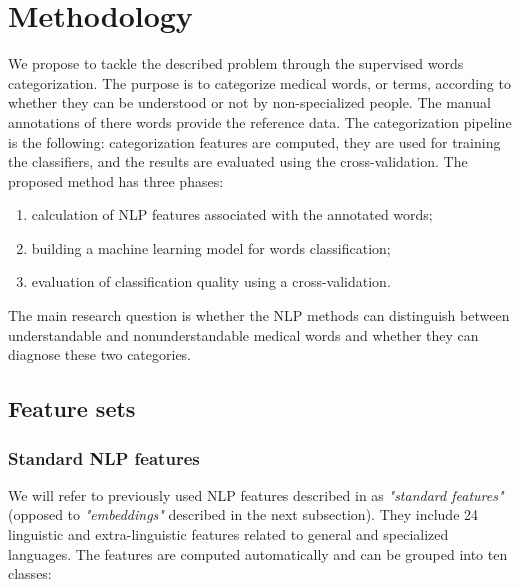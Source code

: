 \chapter{Methodology}
\label{ch:methodology}

We propose to tackle the described problem through the supervised words categorization. The purpose is to categorize medical words, or terms, according to whether they can be understood or not by non-specialized people. The manual annotations of there words provide the reference data. The categorization pipeline is the following: categorization features are computed, they are used for
training the classifiers, and the results are evaluated using the
cross-validation.
The proposed method has three phases: 
\begin{enumerate}
    \item calculation of NLP features associated with the annotated words;
    \item building a machine learning model for words classification;
    \item evaluation of classification quality using a cross-validation.
\end{enumerate}

The main research question is whether the NLP methods
can distinguish between understandable and nonunderstandable medical words and whether they
can diagnose these two categories.


\section{Feature sets}
\subsection{Standard NLP features}

We will refer to previously used NLP features described in \citep{Grabar-PITR2014} as \textit{"standard features"} (opposed to \textit{"embeddings"} described in the next subsection). They include 24 linguistic and extra-linguistic features related to general and specialized languages. The features are computed automatically and can be grouped into ten classes: 

